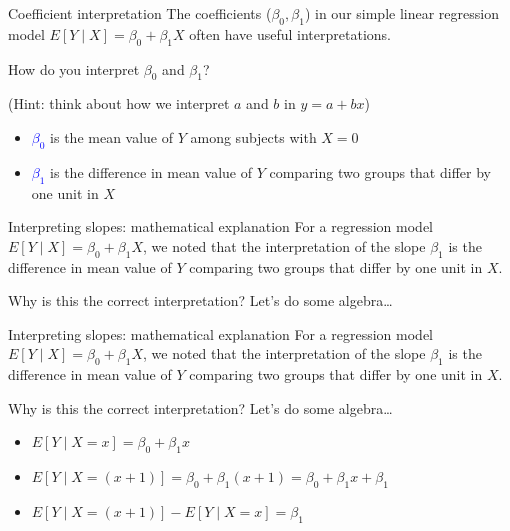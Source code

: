 \documentclass[10pt,t]{beamer}
\begin{document}
\begin{frame}{Coefficient interpretation}
The coefficients ($\beta_0, \beta_1$) in our simple linear regression model $E[Y \mid X] = \beta_0 + \beta_1 X$ often have useful interpretations.

\vspace{0.3cm} 

How do you interpret $\beta_0$ and $\beta_1$?

\vspace{0.3cm} 

\small (Hint: think about how we interpret $a$ and $b$ in $y = a + bx$)

\normalsize 
\vspace{0.3cm} 

\begin{itemize}
	\item \textcolor{blue}{$\beta_0$} is the mean value of $Y$ among subjects with $X = 0$
	\item \textcolor{blue}{$\beta_1$} is the difference in mean value of $Y$ comparing two groups that differ by one unit in $X$
\end{itemize}

\end{frame}

\begin{frame}{Interpreting slopes: mathematical explanation}
For a regression model $E[Y \mid X] = \beta_0 + \beta_1 X$, we noted that the interpretation of the slope $\beta_1$ is the difference in mean value of $Y$ comparing two groups that differ by one unit in $X$. 

\vspace{0.3cm}

Why is this the correct interpretation? Let's do some algebra\dots



\end{frame}

\begin{frame}{Interpreting slopes: mathematical explanation}
For a regression model $E[Y \mid X] = \beta_0 + \beta_1 X$, we noted that the interpretation of the slope $\beta_1$ is the difference in mean value of $Y$ comparing two groups that differ by one unit in $X$. 

\vspace{0.3cm}

Why is this the correct interpretation? Let's do some algebra\dots

\vspace{0.3cm}

\begin{itemize}
	\item $E[Y \mid X = x] = \beta_0 + \beta_1 x$
	\item $E[Y \mid X = (x + 1)] = \beta_0 + \beta_1 (x + 1) = \beta_0 + \beta_1 x + \beta_1$
	\item $E[Y \mid X = (x + 1)] - E[Y \mid X = x] = \beta_1$
\end{itemize}

\end{frame}
\end{document}
